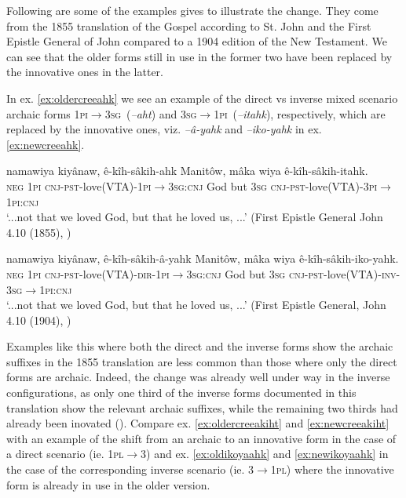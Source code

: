 \documentclass[twoside,a4paper,11pt]{article}
\newcommand{\ipa}[1]{{\phon\textit{#1}}}
\newcommand{\sg}{\textsc{sg}}
\newcommand{\pl}{\textsc{pl}}
\newcommand{\Σ}{\greek{Σ}}
\newcommand{\cnj}{\textsc{cnj}}
\newcommand{\dir}{\textsc{dir}}
\newcommand{\inv}{\textsc{inv}}
\newcommand{\negat}{\textsc{neg}}
\newcommand{\pli}{\textsc{pi}}
\newcommand{\pst}{\textsc{pst}}
\begin{document}
Following are some of the examples  \citealt{dahlstrom89change} gives to illustrate the change. They come from the 1855 translation of the Gospel according to St. John and the First Epistle General of John compared to a 1904 edition of the New Testament. We can see that the older forms still in use in the former two have been replaced by the innovative ones in the latter.

In ex. \ref{ex:oldercreeahk} we see an example of the direct vs inverse mixed scenario archaic forms 1\pli$\rightarrow$3\sg\ (\ipa{--aht}) and 3\sg$\rightarrow$1\pli\ (\ipa{--itahk}), respectively, which are replaced by the innovative ones, viz. \ipa{--â-yahk} and \ipa{--iko-yahk} in ex. \ref{ex:newcreeahk}.
\begin{exe}
\ex 
\begin{xlist}
\ex \label{ex:oldercreeahk}
\gll namawiya kiyânaw, ê-kîh-sâkih-ahk Manitôw, mâka wiya ê-kîh-sâkih-itahk.\\
{\negat} {1\pli} {\cnj-\pst-love(VTA)-1\pli$\rightarrow$3\sg:\cnj} God {but} {3\sg} {\cnj-\pst-love(VTA)-3\pli$\rightarrow$1\pli:\cnj}\\
\glt `...not that we loved God, but that he loved us, ...' (First Epistle General John 4.10 (1855), \citealt[p. 3]{dahlstrom89change})


\ex \label{ex:newcreeahk}
\gll namawiya kiyânaw, ê-kîh-sâkih-â-yahk Manitôw, mâka wiya ê-kîh-sâkih-iko-yahk.\\
{\negat} {1\pli} {\cnj-\pst-love(VTA)-\dir-1\pli$\rightarrow$3\sg:\cnj} God {but} {3\sg} {\cnj-\pst-love(VTA)-\inv-3\sg$\rightarrow$1\pli:\cnj}\\
\glt `...not that we loved God, but that he loved us, ...' (First Epistle General, John 4.10 (1904), \citealt[p. 3]{dahlstrom89change})
\end{xlist}
\end{exe}

Examples like this where both the direct and the inverse forms show the archaic suffixes in the 1855 translation are less common than those where only the direct forms are archaic. Indeed, the change was already well under way in the inverse configurations, as only one third of the inverse forms documented in this translation show the relevant archaic suffixes, while the remaining two thirds had already been inovated (\citealt[p. 3]{dahlstrom89change}). Compare ex. \ref{ex:oldercreeakiht} and \ref{ex:newcreeakiht} with an example of the shift from an archaic to an innovative form in the case of a direct scenario (ie. 1\pl$\rightarrow$3) and ex. \ref{ex:oldikoyaahk} and \ref{ex:newikoyaahk} in the case of the corresponding inverse scenario (ie. 3$\rightarrow$1\pl) where the innovative form is already in use in the older version.
\end{document}
